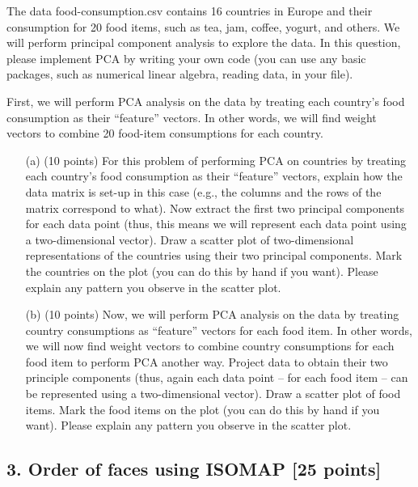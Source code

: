 \documentclass[twoside,10pt]{article}
\begin{document}
The data \textsf{food-consumption.csv} contains 16 countries in Europe and their consumption for 20 food items, such as tea, jam, coffee, yogurt, and others. We will perform principal component analysis to explore the data. In this question, please implement PCA by writing your own code (you can use any basic packages, such as numerical linear algebra, reading data, in your file).


\vspace{.1in}
First, we will perform PCA analysis on the data by treating each country's food consumption as their ``feature'' vectors. In other words, we will find weight vectors to combine 20 food-item consumptions for each country.  
 
\begin{enumerate}

\item[(a)] (10 points) For this problem of performing PCA on countries by treating each country's food consumption as their ``feature'' vectors, explain how the data matrix is set-up in this case (e.g., the columns and the rows of the matrix correspond to what). Now extract the first two principal components for each data point (thus, this means we will represent each data point using a two-dimensional vector). Draw a scatter plot of two-dimensional representations of the countries using their two principal components. Mark the countries on the plot (you can do this by hand if you want). Please explain any pattern you observe in the scatter plot.

\item[(b)] (10 points) Now, we will perform PCA analysis on the data by treating country consumptions as ``feature'' vectors for each food item. In other words, we will now find weight vectors to combine country consumptions for each food item to perform PCA another way. Project data to obtain their two principle components (thus, again each data point -- for each food item -- can be represented using a two-dimensional vector). Draw a scatter plot of food items. Mark the food items on the plot (you can do this by hand if you want). Please explain any pattern you observe in the scatter plot.
\end{enumerate}


\clearpage

\subsection*{3. Order of faces using ISOMAP [25 points]}
\end{document}

